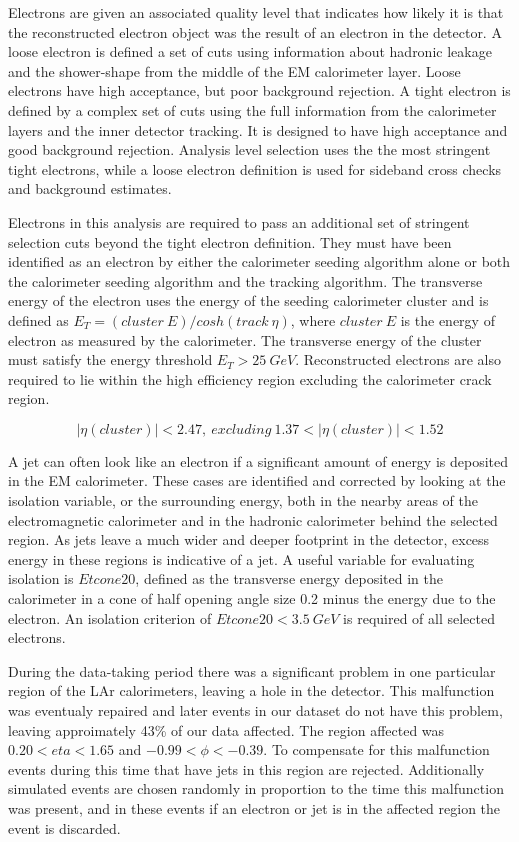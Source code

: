 Electrons are given an associated quality level that indicates how likely it is that the reconstructed electron object was the result of an electron in the detector. A loose electron is defined a set of cuts using information about hadronic leakage and the shower-shape from the middle of the EM calorimeter layer. Loose electrons have high acceptance, but poor background rejection. A tight electron is defined by a complex set of cuts using the full information from the calorimeter layers and the inner detector tracking. It is designed to have high acceptance and good background rejection. Analysis level selection uses the the most stringent tight electrons, while a loose electron definition is used for sideband cross checks and background estimates.

Electrons in this analysis are required to pass an additional set of stringent selection cuts beyond the tight electron definition. They must have been identified as an electron by either the calorimeter seeding algorithm alone or both the calorimeter seeding algorithm and the tracking algorithm. The transverse energy of the electron uses the energy of the seeding calorimeter cluster and is defined as $E_T = (cluster\ E) / cosh (track\ \eta)$, where $cluster\ E$ is the energy of electron as measured by the calorimeter. The transverse energy of the cluster must satisfy the energy threshold $E_T > 25\ GeV$. Reconstructed electrons are also required to lie within the high efficiency region excluding the calorimeter crack region.

\begin{equation}
|\eta(cluster)| < 2.47,\ excluding\ 1.37 < |\eta(cluster)| <1.52
\end{equation}

\noindent
A jet can often look like an electron if a significant amount of energy is deposited in the EM calorimeter. These cases are identified and corrected by looking at the isolation variable, or the surrounding energy, both in the nearby areas of the electromagnetic calorimeter and in the hadronic calorimeter behind the selected region. As jets leave a much wider and deeper footprint in the detector, excess energy in these regions is indicative of a jet. A useful variable for evaluating isolation is $Etcone20$, defined as the transverse energy deposited in the calorimeter in a cone of half opening angle size 0.2 minus the energy due to the electron. An isolation criterion of $Etcone20 < 3.5\ GeV$ is required of all selected electrons. 

During the data-taking period there was a significant problem in one particular region of the LAr calorimeters, leaving a hole in the detector. This malfunction was eventualy repaired and later events in our dataset do not have this problem, leaving approimately 43\% of our data affected. The region affected was $0.20 < eta < 1.65$ and $-0.99 < \phi < -0.39$. To compensate for this malfunction events during this time that have jets in this region are rejected. Additionally simulated events are chosen randomly in proportion to the time this malfunction was present, and in these events if an electron or jet is in the affected region the event is discarded.

